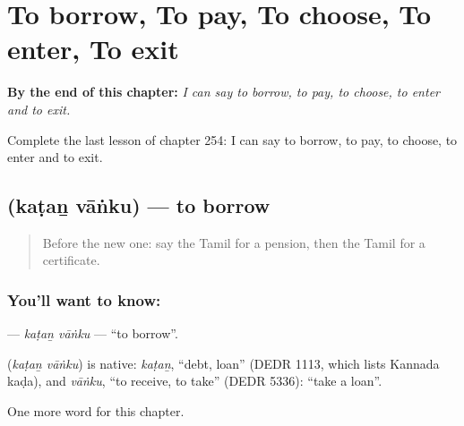 
\chapter{To borrow, To pay, To choose, To enter, To exit}
\label{ch:ta-to-borrow-to-pay-to-choose-to-enter-to-exit}

\begin{chapteropening}
\textbf{By the end of this chapter:} \emph{I can say to borrow, to pay, to choose, to enter and to exit.}

Complete the last lesson of chapter 254: I can say to borrow, to pay, to choose, to enter and to exit.
\end{chapteropening}

\section[\texorpdfstring{\ta{கடன்} \ta{வாங்கு} (kaṭaṉ vāṅku)}{கடன் வாங்கு (kaṭaṉ vāṅku)}]{  (kaṭaṉ vāṅku) — to borrow}

\label{lesson:TA-C254-katan-vanku}



\begin{quote}
Before the new one: say the Tamil for a pension, then the Tamil for a certificate.
\end{quote}

\subsection*{You'll want to know:  }
\textbf{ } — \emph{kaṭaṉ vāṅku} — \textquotedblleft{}to borrow\textquotedblright{}.

\begin{cousinweb}
\textbf{ } (\emph{kaṭaṉ vāṅku}) is native: \emph{kaṭaṉ}, \textquotedblleft{}debt, loan\textquotedblright{} (DEDR 1113, which lists Kannada kaḍa), and \emph{vāṅku}, \textquotedblleft{}to receive, to take\textquotedblright{} (DEDR 5336): \textquotedblleft{}take a loan\textquotedblright{}.
\end{cousinweb}

\begin{grammarlens}[title={What you've built}]
One more word for this chapter.
\end{grammarlens}


